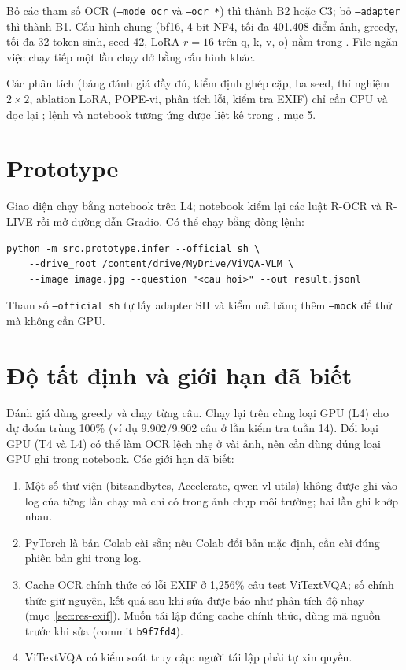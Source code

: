 Bỏ các tham số OCR (\texttt{--mode ocr} và \texttt{--ocr\_*}) thì thành B2 hoặc C3;
bỏ \texttt{--adapter} thì thành B1. Cấu hình chung (bf16, 4-bit NF4, tối đa 401.408
điểm ảnh, greedy, tối đa 32 token sinh, seed 42, LoRA $r = 16$ trên q, k, v, o) nằm
trong . File  ngăn việc chạy
tiếp một lần chạy dở bằng cấu hình khác.

Các phân tích (bảng đánh giá đầy đủ, kiểm định ghép cặp, ba seed, thí nghiệm
$2\times2$, ablation LoRA, POPE-vi, phân tích lỗi, kiểm tra EXIF) chỉ cần CPU và đọc
lại ; lệnh và notebook tương ứng được liệt kê trong
, mục 5.

\section{Prototype}

Giao diện chạy bằng notebook  trên
L4; notebook kiểm lại các luật R-OCR và R-LIVE rồi mở đường dẫn Gradio. Có thể chạy
bằng dòng lệnh:

\begin{small}
\begin{verbatim}
python -m src.prototype.infer --official sh \
    --drive_root /content/drive/MyDrive/ViVQA-VLM \
    --image image.jpg --question "<cau hoi>" --out result.jsonl
\end{verbatim}
\end{small}

Tham số \texttt{--official sh} tự lấy adapter SH và kiểm mã băm; thêm
\texttt{--mock} để thử mà không cần GPU.

\section{Độ tất định và giới hạn đã biết}

Đánh giá dùng greedy và chạy từng câu. Chạy lại trên cùng loại GPU (L4) cho dự đoán
trùng 100\% (ví dụ 9.902/9.902 câu ở lần kiểm tra tuần 14). Đổi loại GPU (T4 và L4)
có thể làm OCR lệch nhẹ ở vài ảnh, nên cần dùng đúng loại GPU ghi trong notebook.
Các giới hạn đã biết:

\begin{enumerate}
  \item Một số thư viện (bitsandbytes, Accelerate, qwen-vl-utils) không được ghi vào
  log của từng lần chạy mà chỉ có trong ảnh chụp môi trường; hai lần ghi khớp nhau.
  \item PyTorch là bản Colab cài sẵn; nếu Colab đổi bản mặc định, cần cài đúng phiên
  bản ghi trong log.
  \item Cache OCR chính thức có lỗi EXIF ở 1,256\% câu test ViTextVQA; số chính thức
  giữ nguyên, kết quả sau khi sửa được báo như phân tích độ nhạy
  (mục~\ref{sec:res-exif}). Muốn tái lập đúng cache chính thức, dùng mã nguồn trước
  khi sửa (commit \texttt{b9f7fd4}).
  \item ViTextVQA có kiểm soát truy cập: người tái lập phải tự xin quyền.
\end{enumerate}
